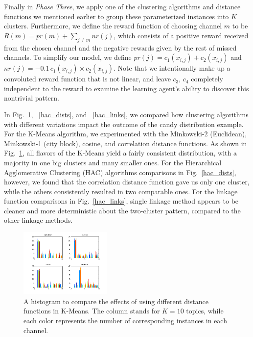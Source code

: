 \documentclass[conference]{IEEEtran}
\begin{document}
Finally in \emph{Phase Three}, we apply one of the clustering algorithms and distance functions we mentioned earlier to group these parameterized instances into $K$ clusters. Furthermore, we define the reward function of choosing channel $m$ to be $R(m) = pr(m) + \sum_{j \neq m}nr(j)$, which consists of a positive reward received from the chosen channel and the negative rewards given by the rest of missed channels. To simplify our model, we define $pr(j) = c_1(x_{i,j}) + c_2(x_{i,j})$ and $nr(j) = -0.1\, c_1(x_{i,j})\times c_2(x_{i,j})$. Note that we intentionally make up a convoluted reward function that is not linear, and leave $c_3,\,c_4$ completely independent to the reward to examine the learning agent's ability to discover this nontrivial pattern. 

In Fig.~\ref{kmeans_dists}, ~\ref{hac_dists}, and ~\ref{hac_links}, we compared how clustering algorithms with different variations impact the outcome of the candy distribution example. For the K-Means algorithm, we experimented with the Minkowski-2 (Euclidean), Minkowski-1 (city block), cosine, and correlation distance functions. As shown in Fig.~\ref{kmeans_dists}, all flavors of the K-Means yield a fairly consistent distribution, with a majority in one big clusters and many smaller ones. For the Hierarchical Agglomerative  Clustering (HAC) algorithms comparisons in Fig.~\ref{hac_dists}, however, we found that the correlation distance function gave us only one cluster, while the others consistently resulted in two comparable ones. For the linkage function comparisons in Fig.~\ref{hac_links}, single linkage method appears to be cleaner and more deterministic about the two-cluster pattern, compared to the other linkage methods. 

\begin{figure}
	\center	
	\includegraphics[width=0.4\textwidth]{fig/kmeans_dists.png}
	\caption{A histogram to compare the effects of using different distance functions in K-Means. The column stands for $K=10$ topics, while each color represents the number of corresponding instances in each channel.}
	\label{kmeans_dists}
\end{figure}
\end{document}
